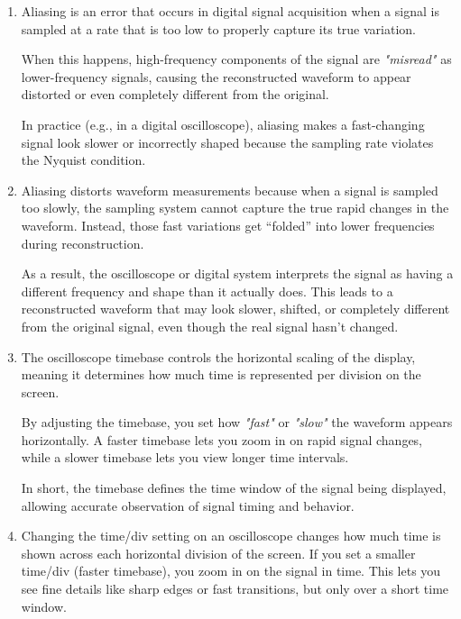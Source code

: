 \documentclass[../main.tex]{subfiles}
\begin{document}
\begin{enumerate}[label=\textbf{\arabic*.}]
	Also if the goal is not defined you might measure something that you actually need with less precision that needed or spend too much time setting up and measuring very precisely something that does not require that level of precision.

	\item Aliasing is an error that occurs in digital signal acquisition when a signal is sampled at a rate that is too low to properly capture its true variation.

	When this happens, high-frequency components of the signal are \textit{"misread"} as lower-frequency signals, causing the reconstructed waveform to appear distorted or even completely different from the original.

	In practice (e.g., in a digital oscilloscope), aliasing makes a fast-changing signal look slower or incorrectly shaped because the sampling rate violates the Nyquist condition.
	
	\item Aliasing distorts waveform measurements because when a signal is sampled too slowly, the sampling system cannot capture the true rapid changes in the waveform. Instead, those fast variations get “folded” into lower frequencies during reconstruction.

	As a result, the oscilloscope or digital system interprets the signal as having a different frequency and shape than it actually does. This leads to a reconstructed waveform that may look slower, shifted, or completely different from the original signal, even though the real signal hasn’t changed.

	\item The oscilloscope timebase controls the horizontal scaling of the display, meaning it determines how much time is represented per division on the screen.

	By adjusting the timebase, you set how \textit{"fast"} or \textit{"slow"} the waveform appears horizontally. 
	A faster timebase lets you zoom in on rapid signal changes, while a slower timebase lets you view longer time intervals.

In short, the timebase defines the time window of the signal being displayed, allowing accurate observation of signal timing and behavior.

	
	
	\item Changing the time/div setting on an oscilloscope changes how much time is shown across each horizontal division of the screen. If you set a smaller time/div (faster timebase), you zoom in on the signal in time. This lets you see fine details like sharp edges or fast transitions, but only over a short time window.


\end{enumerate}
\end{document}
